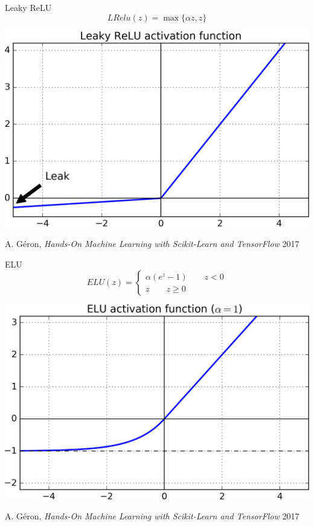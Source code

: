 \documentclass{sa}
\begin{document}
\begin{frame}{Leaky ReLU}
\[ LRelu(z) = \max\{\alpha z, z\} \]
\begin{center}
\includegraphics[width=.8\textwidth]{leaky_relu.png}
\end{center}
{\vfill\footnotesize A. Géron, \emph{Hands-On Machine Learning with Scikit-Learn and TensorFlow} 2017}
\end{frame}

\begin{frame}{ELU}
\[ ELU(z) = \begin{cases} \alpha (e^z-1) \qquad z<0 \\ z \qquad z\geq 0 \end{cases} \]
\begin{center}
\includegraphics[width=.7\textwidth]{elu.png}
\end{center}
{\vfill\footnotesize A. Géron, \emph{Hands-On Machine Learning with Scikit-Learn and TensorFlow} 2017}
\end{frame}
\end{document}
